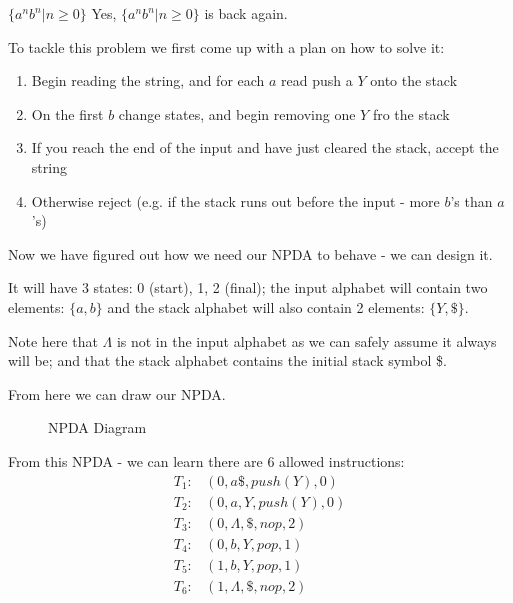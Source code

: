 \begin{example}{$\{a^nb^n|n\geq 0\}$}
Yes, $\{a^nb^n|n\geq 0\}$ is back again. 

To tackle this problem we first come up with a plan on how to solve it:
\begin{enumerate}
    \item Begin reading the string, and for each $a$ read push a $Y$ onto the stack
    \item On the first $b$ change states, and begin removing one $Y$ fro the stack
    \item If you reach the end of the input and have just cleared the stack, accept the string
    \item Otherwise reject (e.g. if the stack runs out before the input - more $b$'s than $a$'s)
\end{enumerate}

Now we have figured out how we need our NPDA to behave - we can design it. 

It will have 3 states: 0 (start), 1, 2 (final); the input alphabet will contain two elements: $\{a, b\}$ and the stack alphabet will also contain 2 elements: $\{Y, \$\}$.

Note here that $\Lambda$ is not in the input alphabet as we can safely assume it always will be; and that the stack alphabet contains the initial stack symbol \$. 

From here we can draw our NPDA.
\begin{figure}[H]
    \centering
    \caption{NPDA Diagram}
\end{figure}

From this NPDA - we can learn there are 6 allowed instructions:
\begin{align*}
T_1: & (0, a \$, push(Y), 0)\\
T_2: & (0, a, Y, push(Y), 0)\\
T_3: & (0, \Lambda, \$, nop, 2)\\
T_4: & (0, b, Y, pop, 1)\\
T_5: & (1, b, Y, pop, 1)\\
T_6: & (1, \Lambda, \$, nop, 2)
\end{align*}
\end{example}

